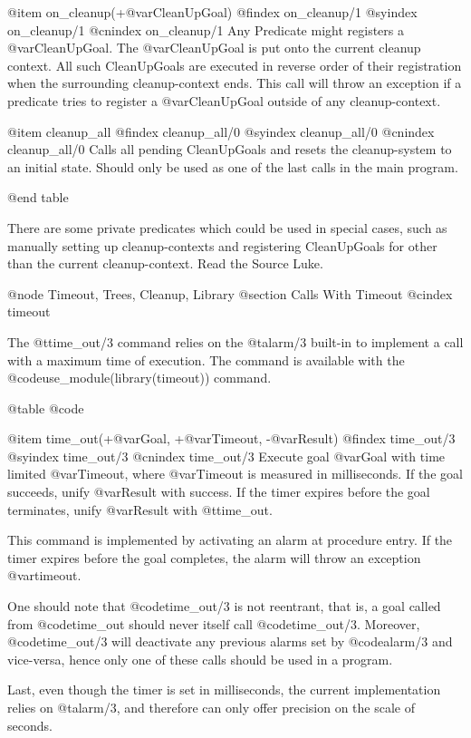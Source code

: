 {{{{{{{{{@item on_cleanup(+@var{CleanUpGoal})
@findex on_cleanup/1
@syindex on_cleanup/1
@cnindex on_cleanup/1
Any Predicate might registers a @var{CleanUpGoal}. The
@var{CleanUpGoal} is put onto the current cleanup context. All such
CleanUpGoals are executed in reverse order of their registration when
the surrounding cleanup-context ends. This call will throw an exception
if a predicate tries to register a @var{CleanUpGoal} outside of any
cleanup-context.

@item cleanup_all
@findex cleanup_all/0
@syindex cleanup_all/0
@cnindex cleanup_all/0
Calls all pending CleanUpGoals and resets the cleanup-system to an
initial state. Should only be used as one of the last calls in the
main program.

@end table

There are some private predicates which could be used in special
cases, such as manually setting up cleanup-contexts and registering
CleanUpGoals for other than the current cleanup-context.
Read the Source Luke.


@node Timeout, Trees, Cleanup, Library
@section Calls With Timeout
@cindex timeout

The @t{time_out/3} command relies on the @t{alarm/3} built-in to
implement a call with a maximum time of execution. The command is
available with the @code{use_module(library(timeout))} command.

@table @code


@item time_out(+@var{Goal}, +@var{Timeout}, -@var{Result})
@findex time_out/3
@syindex time_out/3
@cnindex time_out/3
Execute goal @var{Goal} with time limited @var{Timeout}, where
@var{Timeout} is measured in milliseconds. If the goal succeeds, unify
@var{Result} with success. If the timer expires before the goal
terminates, unify @var{Result} with @t{time_out}.

This command is implemented by activating an alarm at procedure
entry. If the timer expires before the goal completes, the alarm will
throw an exception @var{timeout}.

One should note that @code{time_out/3} is not reentrant, that is, a goal
called from @code{time_out} should never itself call
@code{time_out/3}. Moreover, @code{time_out/3} will deactivate any previous
alarms set by @code{alarm/3} and vice-versa, hence only one of these
calls should be used in a program.

Last, even though the timer is set in milliseconds, the current
implementation relies on @t{alarm/3}, and therefore can only offer
precision on the scale of seconds.

}}}}}}}}}
